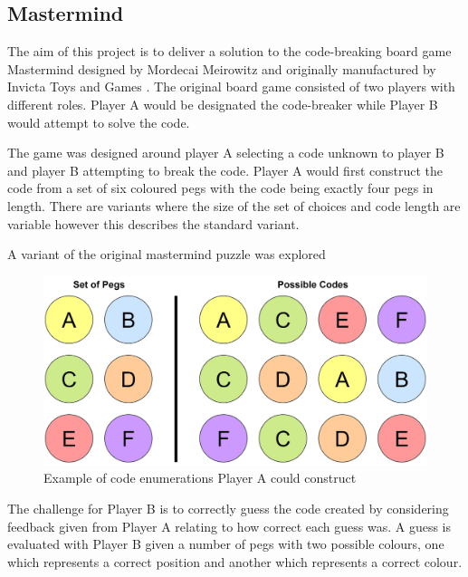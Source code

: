 \documentclass[12pt]{article}  %
\theoremstyle{definition}
\theoremstyle{remark}
\begin{document}
\subsection {Mastermind}

The aim of this project is to deliver a solution to the code-breaking board game Mastermind designed by Mordecai Meirowitz and originally manufactured by Invicta Toys and Games \cite{Invicta}. 
The original board game consisted of two players with different roles. Player A would be designated the code-breaker while Player B would attempt to solve the code.

The game was designed around player A selecting a code unknown to player B and player B attempting to break the code.
Player A would first construct the code from a set of six coloured pegs with the code being exactly four pegs in length. There are variants where the size of the set of choices and code length are variable however this describes the standard variant.

A variant of the original mastermind puzzle was explored 

\begin{figure}[H]
\centering
\includegraphics[scale=0.75]{pegs}
\caption{ Example of code enumerations Player A could construct}
\end{figure}

The challenge for Player B is to correctly guess the code created by considering feedback given from Player A relating to how correct each guess was.
A guess is evaluated with Player B given a number of pegs with two possible colours, one which represents a correct position and another which represents a correct colour.
\end{document}
